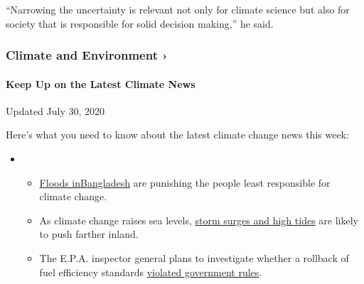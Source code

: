 ``Narrowing the uncertainty is relevant not only for climate science but
also for society that is responsible for solid decision making,'' he
said.

\href{https://www.nytimes3xbfgragh.onion/section/climate?action=click\&pgtype=Article\&state=default\&region=MAIN_CONTENT_1\&context=storylines_keepup}{}

\hypertarget{climate-and-environment-}{%
\subsubsection{Climate and Environment
›}\label{climate-and-environment-}}

\hypertarget{keep-up-on-the-latest-climate-news}{%
\paragraph{Keep Up on the Latest Climate
News}\label{keep-up-on-the-latest-climate-news}}

Updated July 30, 2020

Here's what you need to know about the latest climate change news this
week:

\begin{itemize}
\item
  \begin{itemize}
  \tightlist
  \item
    \href{https://www.nytimes3xbfgragh.onion/2020/07/30/climate/bangladesh-floods.html?action=click\&pgtype=Article\&state=default\&region=MAIN_CONTENT_1\&context=storylines_keepup}{Floods
    in}\href{https://www.nytimes3xbfgragh.onion/2020/07/30/climate/bangladesh-floods.html?action=click\&pgtype=Article\&state=default\&region=MAIN_CONTENT_1\&context=storylines_keepup}{Bangladesh}
    are punishing the people least responsible for climate change.
  \item
    As climate change raises sea levels,
    \href{https://www.nytimes3xbfgragh.onion/2020/07/30/climate/sea-level-inland-floods.html?action=click\&pgtype=Article\&state=default\&region=MAIN_CONTENT_1\&context=storylines_keepup}{storm
    surges and high tides} are likely to push farther inland.
  \item
    The E.P.A. inspector general plans to investigate whether a rollback
    of fuel efficiency standards
    \href{https://www.nytimes3xbfgragh.onion/2020/07/27/climate/trump-fuel-efficiency-rule.html?action=click\&pgtype=Article\&state=default\&region=MAIN_CONTENT_1\&context=storylines_keepup}{violated
    government rules}.
  \end{itemize}
\end{itemize}

